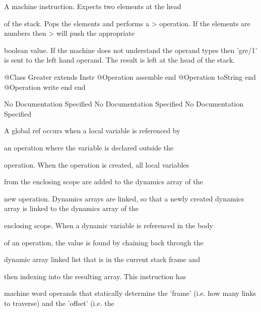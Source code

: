       A machine instruction. Expects two elements at the head

      of the stack. Pops the elements and performs a > operation.
      If the elements are numbers then > will push the appropriate

      boolean value. If the machine does not understand the operand 
      types then 'gre/1' is sent to the left hand operand. The result 
      is left at the head of the stack.
\begin{Interface}
@Class Greater extends Instr
  @Operation assemble end
  @Operation toString end
  @Operation write end
end
\end{Interface}
No Documentation Specified
No Documentation Specified
No Documentation Specified

      A global ref occurs when a local variable is referenced by

      an operation where the variable is declared outside the

      operation. When the operation is created, all local variables

      from the enclosing scope are added to the dynamics array of the

      new operation. Dynamics arrays are linked, so that a newly 
      created dynamics array is linked to the dynamics array of the

      enclosing scope. When a dynamic variable is referenced in the body

      of an operation, the value is found by chaining back through the

      dynamic array linked list that is in the current stack frame and

      then indexing into the resulting array. This instruction has

      machine word operands that statically determine the 'frame'
      (i.e. how many links to traverse) and the 'offset' (i.e. the


